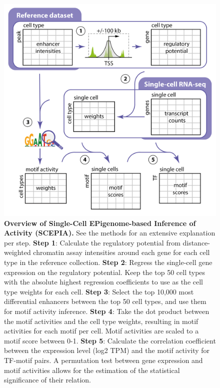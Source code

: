 \begin{figure}
    \centering
    \includegraphics[width=0.8\linewidth]{ch.scepia/imgs/OverviewFigure_SvH_Myriad_v6_Figure2.png}
    \caption{\textbf{Overview of Single-Cell EPigenome-based Inference of Activity (SCEPIA).} See the methods for an extensive explanation per step.
    \textbf{Step 1}: Calculate the regulatory potential from distance-weighted chromatin assay intensities around each gene for each cell type in the reference collection.
    \textbf{Step 2}: Regress the single-cell gene expression on the regulatory potential. Keep the top 50 cell types with the absolute highest regression coefficients to use as the cell type weights for each cell.
    \textbf{Step 3}: Select the top 10,000 most differential enhancers between the top 50 cell types, and use them for motif activity inference.
    \textbf{Step 4}: Take the dot product between the motif activities and the cell type weights, resulting in motif activities for each motif per cell. Motif activities are scaled to a motif score between 0-1. 
    \textbf{Step 5}: Calculate the correlation coefficient between the expression level (log2 TPM) and the motif activity for TF-motif pairs. A permutation test between gene expression and motif activities allows for the estimation of the statistical significance of their relation.}
    \label{fig:scepia_overview}
\end{figure}

